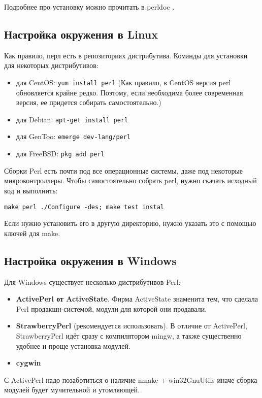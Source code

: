 Подробнее про установку можно прочитать в perldoc .

\subsection{Настройка окружения в Linux}
Как правило, перл есть в репозиториях дистрибутива. Команды для установки для некоторых дистрибутивов:
\begin{itemize}
 \item для CentOS: \verb|yum install perl| (Как правило, в CentOS версия perl обновляется крайне редко. Поэтому, если необходима более современная версия, ее придется собирать самостоятельно.)
 \item для Debian: \verb|apt-get install perl|
 \item для GenToo: \verb|emerge dev-lang/perl|
 \item для FreeBSD: \verb|pkg add perl|
\end{itemize}
Сборки Perl есть почти под все операционные системы, даже под некоторые микроконтроллеры. Чтобы самостоятельно собрать perl, нужно скачать исходный код и выполнить:
\begin{verbatim}
make perl ./Configure -des; make test instal
\end{verbatim}
Если нужно установить его в другую директорию, нужно указать это с помощью ключей для make.

\subsection{Настройка окружения в Windows}
Для Windows существует несколько дистрибутивов Perl:
\begin{itemize}
  \item \textbf{ActivePerl от ActiveState}. Фирма ActiveState знаменита тем, что сделала Perl продакшн-системой, модули для которой они продавали.
  \item \textbf{StrawberryPerl} (рекомендуется использовать). В отличие от ActivePerl, StrawberryPerl идёт сразу с компилятором mingw, а также существенно удобнее и проще установка модулей.
  \item \textbf{cygwin}
\end{itemize}
С ActivePerl надо позаботиться о наличие nmake + win32GnuUtils иначе сборка модулей будет мучительной и утомляющей.


